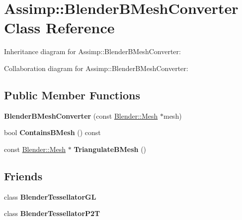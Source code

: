\hypertarget{class_assimp_1_1_blender_b_mesh_converter}{\section{Assimp\+:\+:Blender\+B\+Mesh\+Converter Class Reference}
\label{class_assimp_1_1_blender_b_mesh_converter}
}


Inheritance diagram for Assimp\+:\+:Blender\+B\+Mesh\+Converter\+:


Collaboration diagram for Assimp\+:\+:Blender\+B\+Mesh\+Converter\+:
\subsection*{Public Member Functions}
\begin{DoxyCompactItemize}
\item 
\hypertarget{class_assimp_1_1_blender_b_mesh_converter_a093d132db2fddd52e9ab0b40d80075ce}{{\bfseries Blender\+B\+Mesh\+Converter} (const \hyperlink{struct_assimp_1_1_blender_1_1_mesh}{Blender\+::\+Mesh} $\ast$mesh)}\label{class_assimp_1_1_blender_b_mesh_converter_a093d132db2fddd52e9ab0b40d80075ce}

\item 
\hypertarget{class_assimp_1_1_blender_b_mesh_converter_a3e56bf453c488cdbfb148aceed5fb77f}{bool {\bfseries Contains\+B\+Mesh} () const }\label{class_assimp_1_1_blender_b_mesh_converter_a3e56bf453c488cdbfb148aceed5fb77f}

\item 
\hypertarget{class_assimp_1_1_blender_b_mesh_converter_a9ff8ba20fb7219fcb08dead9208bf0c0}{const \hyperlink{struct_assimp_1_1_blender_1_1_mesh}{Blender\+::\+Mesh} $\ast$ {\bfseries Triangulate\+B\+Mesh} ()}\label{class_assimp_1_1_blender_b_mesh_converter_a9ff8ba20fb7219fcb08dead9208bf0c0}

\end{DoxyCompactItemize}
\subsection*{Friends}
\begin{DoxyCompactItemize}
\item 
\hypertarget{class_assimp_1_1_blender_b_mesh_converter_a0f2bb7565833b803597f4f1df6c0268d}{class {\bfseries Blender\+Tessellator\+G\+L}}\label{class_assimp_1_1_blender_b_mesh_converter_a0f2bb7565833b803597f4f1df6c0268d}

\item 
\hypertarget{class_assimp_1_1_blender_b_mesh_converter_a7871c3f8173453778a380a5416bed826}{class {\bfseries Blender\+Tessellator\+P2\+T}}\label{class_assimp_1_1_blender_b_mesh_converter_a7871c3f8173453778a380a5416bed826}

\end{DoxyCompactItemize}

